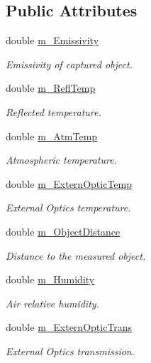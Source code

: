 \subsection*{Public Attributes}
\begin{DoxyCompactItemize}
\item 
double \hyperlink{structwtl_1_1_thermal_parameters_ab9768a97a062f52afb865e7d7b7e62b6}{m\+\_\+\+Emissivity}
\begin{DoxyCompactList}\small\item\em Emissivity of captured object. \end{DoxyCompactList}\item 
double \hyperlink{structwtl_1_1_thermal_parameters_a90139d2cd5373a84fdfe2260f55bebe8}{m\+\_\+\+Refl\+Temp}
\begin{DoxyCompactList}\small\item\em Reflected temperature. \end{DoxyCompactList}\item 
double \hyperlink{structwtl_1_1_thermal_parameters_a275e7c262802793de600786ffe507e07}{m\+\_\+\+Atm\+Temp}
\begin{DoxyCompactList}\small\item\em Atmospheric temperature. \end{DoxyCompactList}\item 
double \hyperlink{structwtl_1_1_thermal_parameters_aa25bcd5f011cc982fbfb3fe34cf0d4d4}{m\+\_\+\+Extern\+Optic\+Temp}
\begin{DoxyCompactList}\small\item\em External Optics temperature. \end{DoxyCompactList}\item 
double \hyperlink{structwtl_1_1_thermal_parameters_a21bbd2f6974df02a6a236712d1b4930f}{m\+\_\+\+Object\+Distance}
\begin{DoxyCompactList}\small\item\em Distance to the measured object. \end{DoxyCompactList}\item 
double \hyperlink{structwtl_1_1_thermal_parameters_a621d78c25ec992e41a3965dda391b079}{m\+\_\+\+Humidity}
\begin{DoxyCompactList}\small\item\em Air relative humidity. \end{DoxyCompactList}\item 
double \hyperlink{structwtl_1_1_thermal_parameters_add8a2b39fb17ee01521ee286cf6479b4}{m\+\_\+\+Extern\+Optic\+Trans}
\begin{DoxyCompactList}\small\item\em External Optics transmission. \end{DoxyCompactList}\end{DoxyCompactItemize}
